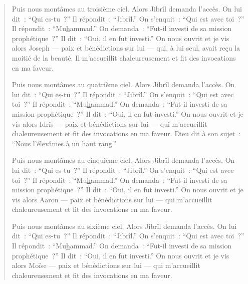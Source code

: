 \begin{quote}
Puis nous montâmes au troisième ciel. Alors Jibrîl demanda l'accès. On
lui dit~: ``Qui es-tu~?'' Il répondit~: ``Jibrîl.'' On s'enquit~: ``Qui
est avec toi~?'' Il répondit~: ``Mu\underline{h}ammad.'' On demanda~:
``Fut-il investi de sa mission prophétique~?'' Il dit~: ``Oui, il en fut
investi.'' On nous ouvrit et je vis alors Joseph --- paix et
bénédictions sur lui --- qui, à lui seul, avait reçu la moitié de la
beauté. Il m'accueillit chaleureusement et fit des invocations en ma
faveur.

Puis nous montâmes au quatrième ciel. Alors Jibrîl demanda l'accès. On
lui dit~: ``Qui es-tu~?'' Il répondit~: ``Jibrîl.'' On s'enquit~: ``Qui
est avec toi~?'' Il répondit~: ``Mu\underline{h}ammad.'' On demanda~:
``Fut-il investi de sa mission prophétique~?'' Il dit~: ``Oui, il en fut
investi.'' On nous ouvrit et je vis alors Idrîs --- paix et bénédictions
sur lui --- qui m'accueillit chaleureusement et fit des invocations en
ma faveur. Dieu dit à son sujet~: ``Nous l'élevâmes à un haut rang.''

Puis nous montâmes au cinquième ciel. Alors Jibrîl demanda l'accès. On
lui dit~: ``Qui es-tu~?'' Il répondit~: ``Jibrîl.'' On s'enquit~: ``Qui
est avec toi~?'' Il répondit~: ``Mu\underline{h}ammad.'' On demanda~:
``Fut-il investi de sa mission prophétique~?'' Il dit~: ``Oui, il en fut
investi.'' On nous ouvrit et je vis alors Aaron --- paix et bénédictions
sur lui --- qui m'accueillit chaleureusement et fit des invocations en
ma faveur.

Puis nous montâmes au sixième ciel. Alors Jibrîl demanda l'accès. On lui
dit~: ``Qui es-tu~?'' Il répondit~: ``Jibrîl.'' On s'enquit~: ``Qui est
avec toi~?'' Il répondit~: ``Mu\underline{h}ammad.'' On demanda~:
``Fut-il investi de sa mission prophétique~?'' Il dit~: ``Oui, il en fut
investi.'' On nous ouvrit et je vis alors Moïse --- paix et bénédictions
sur lui --- qui m'accueillit chaleureusement et fit des invocations en
ma faveur.


\end{quote}
